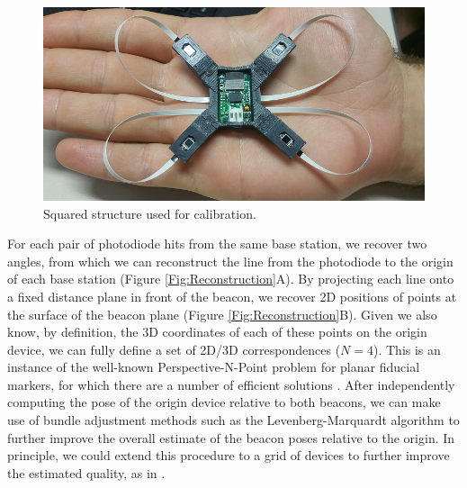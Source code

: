 \documentclass[sigchi]{acmart}
\begin{document}
\begin{figure}[h]
  \centering
  \includegraphics[width=\linewidth]{Figures/squared_structure.jpg}
  \caption{Squared structure used for calibration.}
  \label{Fig:squared_structure}
\end{figure}

For each pair of photodiode hits from the same base station, we recover two angles, from which we can reconstruct the line from the photodiode to the origin of each base station (Figure \ref{Fig:Reconstruction}A). By projecting each line onto a fixed distance plane in front of the beacon, we recover 2D positions of points at the surface of the beacon plane (Figure \ref{Fig:Reconstruction}B). Given we also know, by definition, the 3D coordinates of each of these points on the origin device, we can fully define a set of 2D/3D correspondences ($N = 4$). This is an instance of the well-known Perspective-N-Point problem for planar fiducial markers, for which there are a number of efficient solutions \cite{Lepetit2008,Garrido-Jurado2014}. After independently computing the pose of the origin device relative to both beacons, we can make use of bundle adjustment methods such as the Levenberg-Marquardt algorithm \cite{Marquardt1963} to further improve the overall estimate of the beacon poses relative to the origin. In principle, we could extend this procedure to a grid of devices to further improve the estimated quality, as in \cite{Garrido-Jurado2014}.
\end{document}
